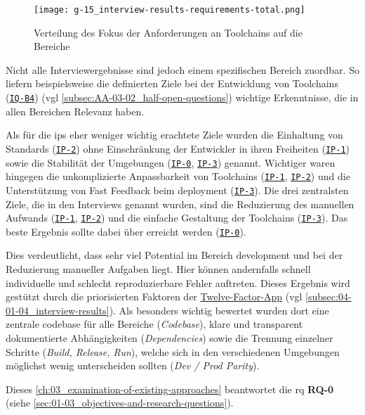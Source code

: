 \begin{figure}[h]
    \centering
    \texttt{[image: g-15\_interview-results-requirements-total.png]}
    \caption{Verteilung des Fokus der Anforderungen an Toolchains auf die Bereiche}
    \label{fig:g-15_interview-results-requirements-total}
\end{figure}

Nicht alle Interviewergebnisse sind jedoch einem spezifischen Bereich zuordbar. So liefern beispielsweise die definierten Ziele bei der Entwicklung von Toolchains (\texttt{\hyperref[subsec:AA-01-02_half-open-questions]{IQ-B4}}) (\acrshort{vgl} \autoref{subsec:AA-03-02_half-open-questions}) wichtige Erkenntnisse, die in allen Bereichen Relevanz haben.

Als für die \Glspl{ip} eher weniger wichtig erachtete Ziele wurden die Einhaltung von Standards (\texttt{\hyperref[sec:AA-02_interview-persons]{IP-2}}) ohne Einschränkung der Entwickler in ihren Freiheiten (\texttt{\hyperref[sec:AA-02_interview-persons]{IP-1}}) sowie die Stabilität der Umgebungen (\texttt{\hyperref[sec:AA-02_interview-persons]{IP-0}}, \texttt{{\hyperref[sec:AA-02_interview-persons]{IP-3}}}) genannt. Wichtiger waren hingegen die unkomplizierte Anpassbarkeit von Toolchains (\texttt{\hyperref[sec:AA-02_interview-persons]{IP-1}}, \texttt{\hyperref[sec:AA-02_interview-persons]{IP-2}}) und die Unterstützung von Fast Feedback beim \Gls{deployment} (\texttt{\hyperref[sec:AA-02_interview-persons]{IP-3}}). Die drei zentralsten Ziele, die in den Interviews genannt wurden, sind die Reduzierung des manuellen Aufwands (\texttt{\hyperref[sec:AA-02_interview-persons]{IP-1}}, \texttt{\hyperref[sec:AA-02_interview-persons]{IP-2}}) und die einfache Gestaltung der Toolchains (\texttt{\hyperref[sec:AA-02_interview-persons]{IP-3}}). Das beste Ergebnis sollte dabei über  erreicht werden (\texttt{\hyperref[sec:AA-02_interview-persons]{IP-0}}).

Dies verdeutlicht, dass sehr viel Potential im Bereich \Gls{development} und bei der Reduzierung manueller Aufgaben liegt. Hier können andernfalls schnell individuelle und schlecht reproduzierbare Fehler auftreten. Dieses Ergebnis wird gestützt durch die priorisierten Faktoren der \hyperref[sec:03-05_basic-idea-of-twelve-factor-app]{Twelve-Factor-App} (\acrshort{vgl} \autoref{subsec:04-01-04_interview-results}). Als besonders wichtig bewertet wurden dort eine zentrale \Gls{codebase} für alle Bereiche (\textit{Codebase}), klare und transparent dokumentierte Abhängigkeiten (\textit{Dependencies}) sowie die Trennung einzelner Schritte (\textit{Build, Release, Run}), welche sich in den verschiedenen Umgebungen möglichst wenig unterscheiden sollten (\textit{Dev / Prod Parity}).

Dieses \autoref{ch:03_examination-of-existing-approaches} beantwortet die \acrlong{rq} \textbf{RQ-0} (siehe \autoref{sec:01-03_objectives-and-research-questions}).
